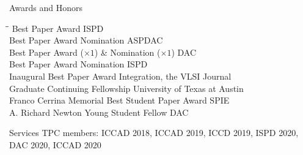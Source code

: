 
\begin{rSection}{Awards and Honors}
\begin{tabbing}
\hspace{3.3in}\= \hspace{3.1in}\= \kill
Best Paper Award \> ISPD  \\
Best Paper Award Nomination \> ASPDAC  \\
Best Paper Award ($\times 1$) \& Nomination ($\times 1$) \> DAC  \\
Best Paper Award Nomination \> ISPD  \\
Inaugural Best Paper Award \> Integration, the VLSI Journal  \\
Graduate Continuing Fellowship \> University of Texas at Austin  \\
Franco Cerrina Memorial Best Student Paper Award \> SPIE  \\
A. Richard Newton Young Student Fellow \> DAC  
\end{tabbing}
\end{rSection}

\begin{rSection}{Services}
TPC members: ICCAD 2018, ICCAD 2019, ICCD 2019, ISPD 2020, DAC 2020, ICCAD 2020
\end{rSection}
